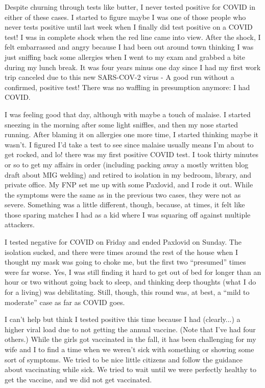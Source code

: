 \documentclass{article}
\begin{document}
Despite churning through tests like butter, I never tested positive for COVID in either of these cases. I started to figure maybe I was one of those people who never tests positive until last week when I finally did test positive on a COVID test! I was in complete shock when the red line came into view. After the shock, I felt embarrassed and angry because I had been out around town thinking I was just sniffing back some allergies when I went to my exam and grabbed a bite during my lunch break. It was four years minus one day since I had my first work trip canceled due to this new SARS-COV-2 virus - A good run without a confirmed, positive test! There was no waffling in presumption anymore: I had COVID.

I was feeling good that day, although with maybe a touch of malaise. I started sneezing in the morning after some light sniffles, and then my nose started running. After blaming it on allergies one more time, I started thinking maybe it wasn't. I figured I'd take a test to see since malaise usually means I'm about to get rocked, and lo! there was my first positive COVID test. I took thirty minutes or so to get my affairs in order (including packing away a mostly written blog draft about MIG welding) and retired to isolation in my bedroom, library, and private office. My FNP set me up with some Paxlovid, and I rode it out. While the symptoms were the same as in the previous two cases, they were not as severe. Something was a little different, though, because, at times, it felt like those sparing matches I had as a kid where I was squaring off against multiple attackers. 

I tested negative for COVID on Friday and ended Paxlovid on Sunday. The isolation sucked, and there were times around the rest of the house when I thought my mask was going to choke me, but the first two ``presumed'' times were far worse. Yes, I was still finding it hard to get out of bed for longer than an hour or two without going back to sleep, and thinking deep thoughts (what I do for a living) was debilitating. Still, though, this round was, at best, a ``mild to moderate'' case as far as COVID goes.

I can't help but think I tested positive this time because I had (clearly...) a higher viral load due to not getting the annual vaccine. (Note that I've had four others.) While the girls got vaccinated in the fall, it has been challenging for my wife and I to find a time when we weren't sick with something or showing some sort of symptoms. We tried to be nice little citizens and follow the guidance about vaccinating while sick. We tried to wait until we were perfectly healthy to get the vaccine, and we did not get vaccinated. 
\end{document}
